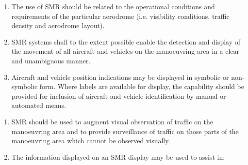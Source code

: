 \begin{enumeratesc}
    \begin{enumerate}
        \item The use of SMR should be related to the operational conditions and requirements of the particular aerodrome (i.e. visibility conditions, traffic density and aerodrome layout).
        \item SMR systems shall to the extent possible enable the detection and display of the movement of all aircraft and vehicles on the manoeuvring area in a clear and unambiguous manner.
        \item Aircraft and vehicle position indications may be displayed in symbolic or non-symbolic form. Where labels are available for display, the capability should be provided for inclusion of aircraft and vehicle identification by manual or automated means.
    \end{enumerate}

    \begin{enumerate}
        \item SMR should be used to augment visual observation of traffic on the manoeuvring area and to provide surveillance of traffic on those parts of the manoeuvring area which cannot be observed visually.
        \item The information displayed on an SMR display may be used to assist in:
        
    \end{enumerate}


\end{enumeratesc}
